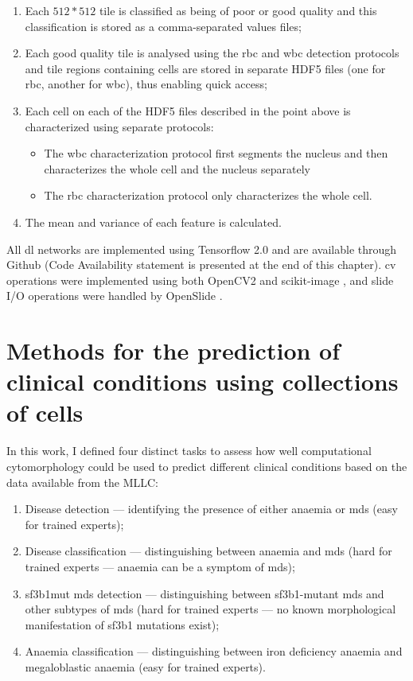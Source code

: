 \begin{enumerate}
    \item Each $512*512$ tile is classified as being of poor or good quality and this classification is stored as a comma-separated values files;
    \item Each good quality tile is analysed using the \ac{rbc} and \ac{wbc} detection protocols and tile regions containing cells are stored in separate HDF5 files (one for \ac{rbc}, another for \ac{wbc}), thus enabling quick access;
    \item Each cell on each of the HDF5 files described in the point above is characterized using separate protocols:
    \begin{itemize}
        \item The \ac{wbc} characterization protocol first segments the nucleus and then characterizes the whole cell and the nucleus separately
        \item The \ac{rbc} characterization protocol only characterizes the whole cell.
    \end{itemize}
    \item The mean and variance of each feature is calculated.
\end{enumerate}

All \ac{dl} networks are implemented using Tensorflow 2.0 \cite{tensorflow2015-whitepaper} and are available through Github (Code Availability statement is presented at the end of this chapter). \Ac{cv} operations were implemented using both OpenCV2 \cite{opencv_library} and scikit-image \cite{van2014scikit}, and slide I/O operations were handled by OpenSlide \cite{Goode2013-zs}.

\section{Methods for the prediction of clinical conditions using collections of cells}

In this work, I defined four distinct tasks to assess how well computational cytomorphology could be used to predict different clinical conditions based on the data available from the MLLC:

\begin{enumerate}
    \item Disease detection --- identifying the presence of either anaemia or \ac{mds} (easy for trained experts);
    \item Disease classification --- distinguishing between anaemia and \ac{mds} (hard for trained experts --- anaemia can be a symptom of \ac{mds});
    \item \ac{sf3b1}mut \ac{mds} detection --- distinguishing between \ac{sf3b1}-mutant \ac{mds} and other subtypes of \ac{mds} (hard for trained experts --- no known morphological manifestation of \ac{sf3b1} mutations exist);
    \item Anaemia classification --- distinguishing between iron deficiency anaemia and megaloblastic anaemia (easy for trained experts).
\end{enumerate}

